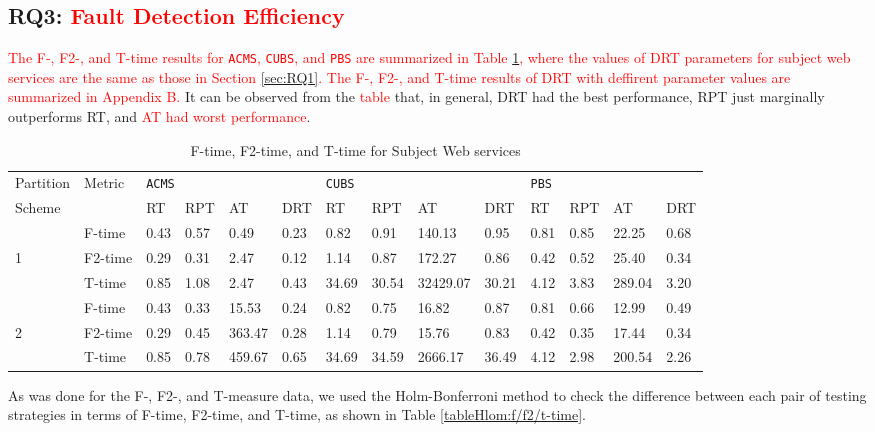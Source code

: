 \documentclass[10pt,journal,compsoc]{IEEEtran}
\begin{document}
\subsection{RQ3: \textcolor{red}{Fault Detection Efficiency}}
\label{sec:RQ3}

\textcolor{red}{The F-, F2-, and T-time results for \texttt{ACMS}, \texttt{CUBS}, and \texttt{PBS} are summarized in Table \ref{tab:time}, where the values of DRT parameters for subject web services are the same as those in Section \ref{sec:RQ1}. The F-, F2-, and T-time results of DRT with deffirent parameter values are summarized in Appendix B.} It can be observed from the \textcolor{red}{table} that, in general, DRT had the best performance, RPT just marginally outperforms RT, and \textcolor{red}{AT had worst performance}.


\begin{table}
	\caption{F-time, F2-time, and T-time for Subject Web services}
	\centering
	\label{tab:time}
	\begin{tabular}{llllllllllllll}
	\toprule
	Partition&\multirow{2}{*}{Metric}&\multicolumn{4}{l}{\texttt{ACMS}}&\multicolumn{4}{l}{\texttt{CUBS}}&\multicolumn{4}{l}{\texttt{PBS}} \\ \cmidrule(lr){3-6} \cmidrule(lr){7-10} \cmidrule(lr){11-14}
	Scheme   &        &RT  &RPT   &AT     &DRT    &RT   &RPT   &AT      &DRT   &RT  &RPT   &AT    &DRT  \\ \midrule
	         &F-time  &0.43&0.57  &0.49   &0.23   &0.82 &0.91  &140.13  &0.95  &0.81&0.85  &22.25 &0.68 \\
	1        &F2-time &0.29&0.31  &2.47   &0.12   &1.14 &0.87  &172.27  &0.86  &0.42&0.52  &25.40 &0.34 \\
	         &T-time  &0.85&1.08  &2.47   &0.43   &34.69&30.54 &32429.07&30.21 &4.12&3.83  &289.04&3.20 \\ \midrule
	         &F-time  &0.43&0.33  &15.53  &0.24   &0.82 &0.75  &16.82   &0.87  &0.81&0.66  &12.99 &0.49 \\
	2        &F2-time &0.29&0.45  &363.47 &0.28   &1.14 &0.79  &15.76   &0.83  &0.42&0.35  &17.44 &0.34 \\
	         &T-time  &0.85&0.78  &459.67 &0.65   &34.69&34.59 &2666.17 &36.49 &4.12&2.98  &200.54&2.26 \\
	\bottomrule 
	\end{tabular}
\end{table}




As was done for the F-, F2-, and T-measure data, we used the Holm-Bonferroni method to check the difference between each pair of testing strategies in terms of F-time, F2-time, and T-time, as shown in Table \ref{tableHlom:f/f2/t-time}.
\end{document}
